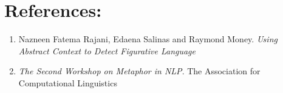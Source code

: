 \documentclass[11pt] {article}
\begin{document}
\section{References:}
\begin{enumerate}
\item Nazneen Fatema Rajani, Edaena Salinas and Raymond Money. \emph	{Using Abstract Context to Detect Figurative Language}
\item \emph{The Second Workshop on Metaphor in NLP}.  The Association for Computational Linguistics
\end{enumerate}

\end{document}
